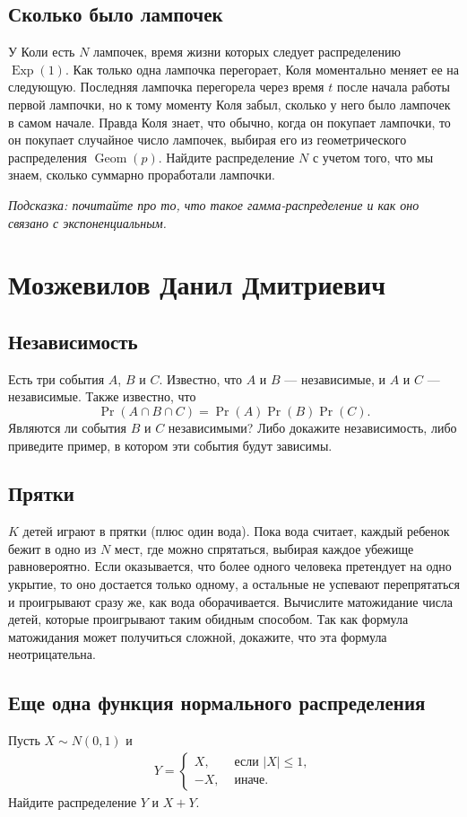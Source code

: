 \documentclass[12pt]{article}
\DeclareMathOperator{\Geom}{Geom}
\DeclareMathOperator{\Exp}{Exp}
\begin{document}
\subsection{Сколько было лампочек}
У Коли есть $N$ лампочек, время жизни которых следует распределению $\Exp(1)$. Как только одна лампочка перегорает, Коля моментально меняет ее на следующую. Последняя лампочка перегорела через время $t$ после начала работы первой лампочки, но к тому моменту Коля забыл, сколько у него было лампочек в самом начале. Правда Коля знает, что обычно, когда он покупает лампочки, то он покупает случайное число лампочек, выбирая его из геометрического распределения $\Geom(p)$. Найдите распределение $N$ с учетом того, что мы знаем, сколько суммарно проработали лампочки. 

\emph{Подсказка: почитайте про то, что такое гамма-распределение и как оно связано с экспоненциальным.}

\newpage
\section{Мозжевилов Данил Дмитриевич}

\subsection{Независимость}
Есть три события $A$, $B$ и $C$. Известно, что $A$ и $B$ --- независимые, и $A$ и $C$ --- независимые. Также известно, что \[\Pr(A \cap B \cap C) = \Pr(A)\Pr(B)\Pr(C).\] Являются ли события $B$ и $C$ независимыми? Либо докажите независимость, либо приведите пример, в котором эти события будут зависимы.

\subsection{Прятки}
$K$ детей играют в прятки (плюс один вода). Пока вода считает, каждый ребенок бежит в одно из $N$ мест, где можно спрятаться, выбирая каждое убежище равновероятно. Если оказывается, что более одного человека претендует на одно укрытие, то оно достается только одному, а остальные не успевают перепрятаться и проигрывают сразу же, как вода оборачивается. Вычислите матожидание числа детей, которые проигрывают таким обидным способом. Так как формула матожидания может получиться сложной, докажите, что эта формула неотрицательна.

\subsection{Еще одна функция нормального распределения}
Пусть $X \sim N(0, 1)$ и 
\begin{align*}
    Y = \begin{cases}
        X, &\text{ если } |X| \le 1, \\
        -X, &\text{ иначе.}
    \end{cases}
\end{align*}
Найдите распределение $Y$ и $X + Y$.
\end{document}
